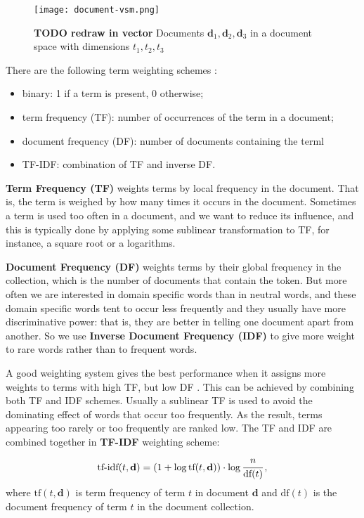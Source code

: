 \begin{figure}[h]
\centering\texttt{[image: document-vsm.png]}
\caption{\textbf{TODO redraw in vector} Documents $\mathbf d_1, \mathbf d_2, \mathbf d_3$
in a document space with dimensions $t_1, t_2, t_3$}
\label{fig:document-vsm}
\end{figure}


There are the following term weighting schemes \cite{manning2008introduction}:

\begin{itemize}
\itemsep1pt\parskip0pt
  \item binary: 1 if a term is present, 0 otherwise;
  \item term frequency (TF): number of occurrences of the term in a document;
  \item document frequency (DF): number of documents containing the terml
  \item TF-IDF: combination of TF and inverse DF.
\end{itemize}


\textbf{Term Frequency (TF)} weights terms by local frequency in the document.
That is, the term is weighed by how many times it occurs in the document.
Sometimes a term is used too often in a document, and we want to
reduce its influence, and this is typically done by applying some
sublinear transformation to TF, for instance, a square root or a logarithms.

\textbf{Document Frequency (DF)} weights terms by their global frequency
in the collection, which is the number of documents that contain the token.
But more often we are interested in domain specific words than in neutral words,
and these domain specific words tent to occur less frequently and they usually
have more discriminative power: that is, they are better in telling one document apart from another. So we use \textbf{Inverse Document Frequency (IDF)} to give more
weight to rare words rather than to frequent words.

A good weighting system gives the best performance when it assigns
more weights to terms with high TF, but low DF \cite{salton1988term}.
This can be achieved by combining both TF and IDF
schemes. Usually a sublinear TF is used to avoid the dominating effect of
words that occur too frequently. As the result, terms appearing
too rarely or too frequently are ranked low.
The TF and IDF are combined together in \textbf{TF-IDF} weighting scheme:
$$\text{tf-idf}(t, \mathbf d) = (1 + \log \text{tf}(t, \mathbf d)) \cdot \log \cfrac{n}{\text{df}(t)} \, ,$$
where $\text{tf}(t, \mathbf d)$ is term frequency of term $t$ in document
$\mathbf d$ and $\text{df}(t)$ is the document frequency of term $t$ in
the document collection.

